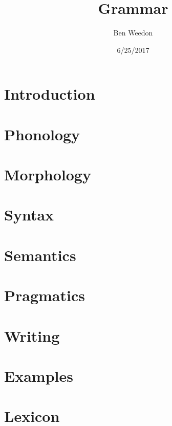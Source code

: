 \documentclass{article}
\title{\name{} Grammar}
\author{Ben Weedon}
\date{6/25/2017}
\begin{document}
    \maketitle

    \section{Introduction}
    
    \section{Phonology}
    
    \section{Morphology}
    
    \section{Syntax}
    
    \section{Semantics}
    
    \section{Pragmatics}
    
    \section{Writing}
    
    \section{Examples}
    
    \section{Lexicon}
    
\end{document}
